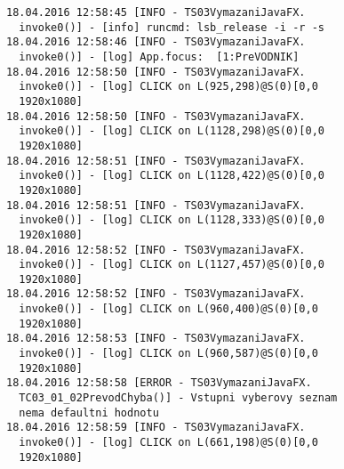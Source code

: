 {\lstset{basicstyle=\ttfamily\small}
		\begin{lstlisting}[]
18.04.2016 12:58:45 [INFO - TS03VymazaniJavaFX.
  invoke0()] - [info] runcmd: lsb_release -i -r -s
18.04.2016 12:58:46 [INFO - TS03VymazaniJavaFX.
  invoke0()] - [log] App.focus:  [1:PreVODNIK]
18.04.2016 12:58:50 [INFO - TS03VymazaniJavaFX.
  invoke0()] - [log] CLICK on L(925,298)@S(0)[0,0
  1920x1080]
18.04.2016 12:58:50 [INFO - TS03VymazaniJavaFX.
  invoke0()] - [log] CLICK on L(1128,298)@S(0)[0,0
  1920x1080]
18.04.2016 12:58:51 [INFO - TS03VymazaniJavaFX.
  invoke0()] - [log] CLICK on L(1128,422)@S(0)[0,0
  1920x1080]
18.04.2016 12:58:51 [INFO - TS03VymazaniJavaFX.
  invoke0()] - [log] CLICK on L(1128,333)@S(0)[0,0
  1920x1080]
18.04.2016 12:58:52 [INFO - TS03VymazaniJavaFX.
  invoke0()] - [log] CLICK on L(1127,457)@S(0)[0,0
  1920x1080]
18.04.2016 12:58:52 [INFO - TS03VymazaniJavaFX.
  invoke0()] - [log] CLICK on L(960,400)@S(0)[0,0
  1920x1080]
18.04.2016 12:58:53 [INFO - TS03VymazaniJavaFX.
  invoke0()] - [log] CLICK on L(960,587)@S(0)[0,0
  1920x1080]
18.04.2016 12:58:58 [ERROR - TS03VymazaniJavaFX.
  TC03_01_02PrevodChyba()] - Vstupni vyberovy seznam
  nema defaultni hodnotu
18.04.2016 12:58:59 [INFO - TS03VymazaniJavaFX.
  invoke0()] - [log] CLICK on L(661,198)@S(0)[0,0
  1920x1080]
	\end{lstlisting}}